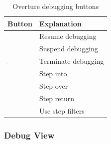 \documentclass{overturerepsec}
\begin{document}
\begin{table}
\begin{center}
\caption{Overture debugging buttons\label{tab:debugButtons}}
\begin{tabular}{|l|l|}\hline \hline
\textbf{Button} & \textbf{Explanation} \\ \hline
\includegraphics[width=0.03\textwidth]{figures/resume} & Resume
debugging\index{icon!resume debugging} \\
\includegraphics[width=0.03\textwidth]{figures/suspend} & Suspend
debugging\index{icon!suspend debugging}\\
\includegraphics[width=0.03\textwidth]{figures/terminate} & Terminate
debugging\index{icon!terminate debugging}\\
\includegraphics[width=0.03\textwidth]{figures/stepinto} & Step
into\index{icon!step into}\\
\includegraphics[width=0.03\textwidth]{figures/stepover} & Step
over\index{icon!step over} \\
\includegraphics[width=0.03\textwidth]{figures/stepreturn} & Step
return\index{icon!step return}\\
\includegraphics[width=0.03\textwidth]{figures/stepbystep} & Use step
filters\index{icon!use step filters}\\
\hline \hline
\end{tabular}
\end{center}
\end{table}

\subsubsection{Debug View}
\end{document}
